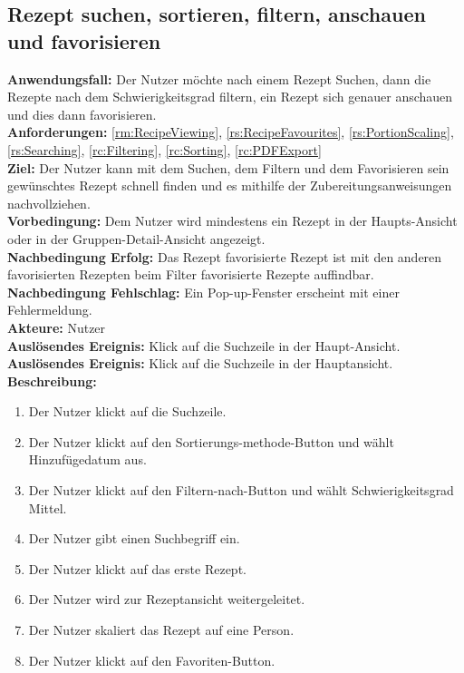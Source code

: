 \documentclass[parskip=full]{scrartcl}
\begin{document}
\subsection{Rezept suchen, sortieren, filtern, anschauen und favorisieren}
\textbf{Anwendungsfall:} Der Nutzer möchte nach einem Rezept Suchen, dann die Rezepte nach dem Schwierigkeitsgrad filtern, ein Rezept sich genauer anschauen und dies dann favorisieren.\\
\textbf{Anforderungen:} \ref{rm:RecipeViewing}, \ref{rs:RecipeFavourites}, \ref{rs:PortionScaling}, \ref{rs:Searching}, \ref{rc:Filtering}, \ref{rc:Sorting}, \ref{rc:PDFExport}\\
\textbf{Ziel:} Der Nutzer kann mit dem Suchen, dem Filtern und dem Favorisieren sein gewünschtes Rezept schnell finden und es mithilfe der Zubereitungsanweisungen nachvollziehen.\\
\textbf{Vorbedingung:} Dem Nutzer wird mindestens ein Rezept in der Haupts-Ansicht oder in der Gruppen-Detail-Ansicht angezeigt.\\
\textbf{Nachbedingung Erfolg:} Das Rezept favorisierte Rezept ist mit den anderen favorisierten Rezepten beim Filter favorisierte Rezepte auffindbar.\\
\textbf{Nachbedingung Fehlschlag:} Ein Pop-up-Fenster erscheint mit einer Fehlermeldung.\\
\textbf{Akteure:} Nutzer\\
\textbf{Auslösendes Ereignis:} Klick auf die Suchzeile in der Haupt-Ansicht.\\
\textbf{Auslösendes Ereignis:} Klick auf die Suchzeile in der Hauptansicht.\\
\textbf{Beschreibung:}
\begin{enumerate}
    \item Der Nutzer klickt auf die Suchzeile.
    \item Der Nutzer klickt auf den Sortierungs-methode-Button und wählt Hinzufügedatum aus.
    \item Der Nutzer klickt auf den Filtern-nach-Button und wählt Schwierigkeitsgrad Mittel.
    \item Der Nutzer gibt einen Suchbegriff ein.
    \item Der Nutzer klickt auf das erste Rezept.
    \item Der Nutzer wird zur Rezeptansicht weitergeleitet.
    \item Der Nutzer skaliert das Rezept auf eine Person.
    \item Der Nutzer klickt auf den Favoriten-Button.
\end{enumerate}
\end{document}
